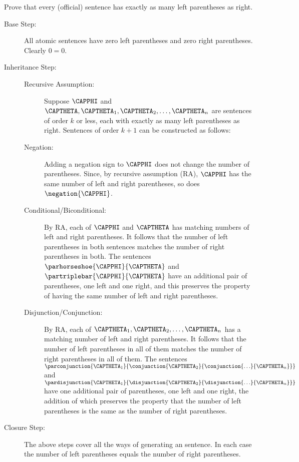 \begin{majorILnc}{} 
Prove that every (official) sentence has exactly as many left parentheses as right.
\begin{PROOF}
\begin{description}
	\item[Base Step:] All atomic sentences have zero left parentheses and zero right parentheses. 
	Clearly $0=0$.
	\item[Inheritance Step:] \hfill{}

	\begin{description}

		\item[Recursive Assumption:] Suppose $\CAPPHI$ and $\CAPTHETA,\CAPTHETA_1,\CAPTHETA_2,\ldots,\CAPTHETA_{\integer{n}}$ are sentences of order $k$ or less, each with exactly as many left parentheses as right.
		Sentences of order $k+1$ can be constructed as follows:

		\item[Negation:] Adding a negation sign to $\CAPPHI$ does not change the number of parentheses. Since, by recursive assumption (RA), $\CAPPHI$ has the same number of left and right parentheses, so does $\negation{\CAPPHI}$.

		\item[Conditional/Biconditional:] By RA, each of $\CAPPHI$ and $\CAPTHETA$ has matching numbers of left and right parentheses.
		It follows that the number of left parentheses in both sentences matches the number of right parentheses in both.
		The sentences $\parhorseshoe{\CAPPHI}{\CAPTHETA}$ and $\partriplebar{\CAPPHI}{\CAPTHETA}$ have an additional pair of parentheses, one left and one right, and this preserves the property of having the same number of left and right parentheses.

		\item[Disjunction/Conjunction:] By RA, each of $\CAPTHETA_1,\CAPTHETA_2,\ldots,\CAPTHETA_{\integer{n}}$ has a matching number of left and right parentheses.
		It follows that the number of left parentheses in all of them matches the number of right parentheses in all of them.
		The sentences $\parconjunction{\CAPTHETA_1}{\conjunction{\CAPTHETA_2}{\conjunction{\ldots}{\CAPTHETA_{\integer{n}}}}}$ and $\pardisjunction{\CAPTHETA_1}{\disjunction{\CAPTHETA_2}{\disjunction{\ldots}{\CAPTHETA_{\integer{n}}}}}$ have one additional pair of parentheses, one left and one right, the addition of which preserves the property that the number of left parentheses is the same as the number of right parentheses.
	\end{description}

	\item[Closure Step:] The above steps cover all the ways of generating an \GSL{} sentence. In each case the number of left parentheses equals the number of right parentheses.
\end{description}
\end{PROOF}
\end{majorILnc}

